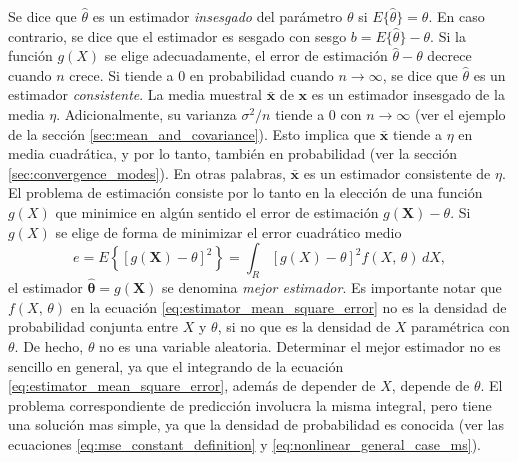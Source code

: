 \documentclass[a4paper]{report}
\newcommand{\X}{\mathbf{X}}
\newcommand{\x}{\mathbf{x}}
\newcommand{\thetabf}{\bm{\theta}}
\begin{document}
Se dice que \(\hat{\theta}\) es un estimador \emph{insesgado} del parámetro \(\theta\) si \(E\{\hat{\theta}\}=\theta\). En caso contrario, se dice que el estimador es sesgado con sesgo \(b=E\{\hat{\theta}\}-\theta\). Si la función \(g(X)\) se elige adecuadamente, el error de estimación \(\hat{\theta}-\theta\) decrece cuando \(n\) crece. Si tiende a 0 en probabilidad cuando \(n\to\infty\), se dice que \(\hat{\theta}\) es un estimador \emph{consistente}. La media muestral \(\bar{\x}\) de \(\x\) es un estimador insesgado de la media \(\eta\). Adicionalmente, su varianza \(\sigma^2/n\) tiende a 0 con \(n\to\infty\) (ver el ejemplo de la sección \ref{sec:mean_and_covariance}). Esto implica que \(\bar{\x}\) tiende a \(\eta\) en media cuadrática, y por lo tanto, también en probabilidad (ver la sección \ref{sec:convergence_modes}). En otras palabras, \(\bar{\x}\) es un estimador consistente de \(\eta\). El problema de estimación consiste por lo tanto en la elección de una función \(g(X)\) que minimice en algún sentido el error de estimación \(g(\X)-\theta\). Si \(g(X)\) se elige de forma de minimizar el error cuadrático medio
\begin{equation}\label{eq:estimator_mean_square_error}
 e=E\left\{[g(\X)-\theta]^2\right\}=\int_{R}[g(X)-\theta]^2f(X,\,\theta)\,dX,
\end{equation}
el estimador \(\hat{\thetabf}=g(\X)\) se denomina \emph{mejor estimador}. Es importante notar que \(f(X,\,\theta)\) en la ecuación \ref{eq:estimator_mean_square_error} no es la densidad de probabilidad conjunta entre \(X\) y \(\theta\), si no que es la densidad de \(X\) paramétrica con \(\theta\). De hecho, \(\theta\) no es una variable aleatoria. Determinar el mejor estimador no es sencillo en general, ya que el integrando de la ecuación \ref{eq:estimator_mean_square_error}, además de depender de \(X\), depende de \(\theta\). El problema correspondiente de predicción involucra la misma integral, pero tiene una solución mas simple, ya que la densidad de probabilidad es conocida (ver las ecuaciones \ref{eq:mse_constant_definition} y \ref{eq:nonlinear_general_case_ms}).






\end{document}
